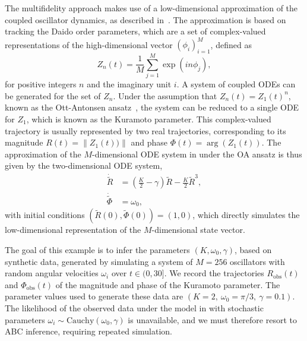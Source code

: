 \documentclass[12pt, onecolumn]{article}
\newcommand{\obs}[1]{#1_{\mathrm{obs}}}
\begin{document}
The multifidelity approach makes use of a low-dimensional approximation of the coupled oscillator dynamics, as described in~\cite{Hannay2018,Ott2008,Ott2009}.
The approximation is based on tracking the Daido order parameters, which are a set of complex-valued representations of the high-dimensional vector $(\phi_i)_{i=1}^M$, defined as
\[
 Z_n(t) = \frac{1}{M} \sum_{j=1}^M \exp( i n \phi_j),
\]
for positive integers $n$ and the imaginary unit $i$.
A system of coupled ODEs can be generated for the set of $Z_n$.
Under the assumption that $Z_n(t) = Z_1(t)^n$, known as the Ott-Antonsen ansatz~\cite{Hannay2018,Ott2008}, the system can be reduced to a single ODE for $Z_1$, which is known as the Kuramoto parameter.
This complex-valued trajectory is usually represented by two real trajectories, corresponding to its magnitude $R(t) = \| Z_1(t)) \|$ and phase $\Phi(t) = \arg(Z_1(t))$.
The approximation of the $M$-dimensional ODE system in  under the OA ansatz is thus given by the two-dimensional ODE system,
\begin{subequations}
\label{eq:Kuramoto_lo}
\begin{align}
 \dot{\tilde R} &= \left( \frac{K}{2} - \gamma \right) \tilde R - \frac{K}{2} \tilde R^3, \\
 \dot{\tilde \Phi} &= \omega_0,
\end{align}
\end{subequations}
with initial conditions $(\tilde R(0), \tilde \Phi(0)) = (1, 0)$, which directly simulates the low-dimensional representation of the $M$-dimensional state vector.

The goal of this example is to infer the parameters $(K, \omega_0, \gamma)$, based on synthetic data, generated by simulating a system of $M=256$ oscillators with random angular velocities $\omega_i$ over $t \in (0, 30]$.
We record the trajectories $\obs R(t)$ and $\obs \Phi(t)$ of the magnitude and phase of the Kuramoto parameter.
The parameter values used to generate these data are $(K=2,~\omega_0 = \pi/3,~\gamma=0.1)$.
The likelihood of the observed data under the model in  with stochastic parameters $\omega_i \sim \mathrm{Cauchy}(\omega_0, \gamma)$ is unavailable, and we must therefore resort to ABC inference, requiring repeated simulation.
\end{document}
